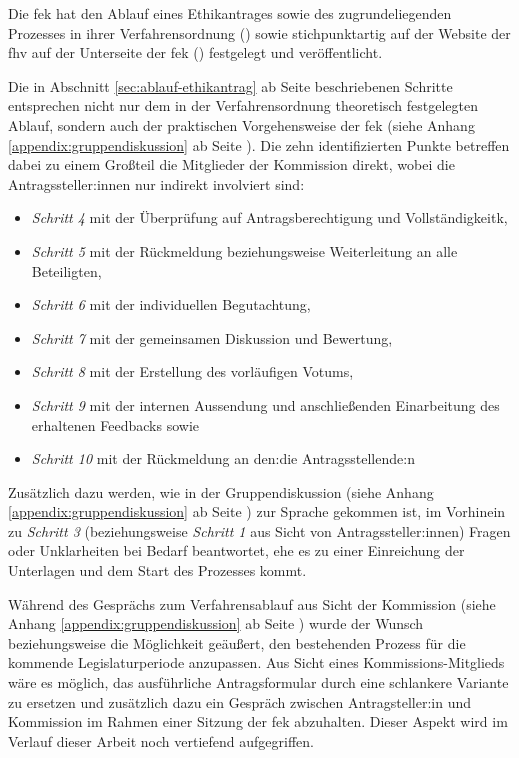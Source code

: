\documentclass[a4paper,12pt,twoside]{scrreprt}
\begin{document}
Die \acl{fek} hat den Ablauf eines Ethikantrages sowie des zugrundeliegenden Prozesses in ihrer Verfahrensordnung (\cite{forschungsethik-kommission_der_fachhochschule_vorarlberg_verfahrensordnung_2020}) sowie stichpunktartig auf der Website der \ac{fhv} auf der Unterseite der \ac{fek} (\cite{fachhochschule_vorarlberg_gmbh_forschungsethik-kommission_2021}) festgelegt und veröffentlicht.

Die in Abschnitt \ref{sec:ablauf-ethikantrag} ab Seite \pageref{sec:ablauf-ethikantrag} beschriebenen Schritte entsprechen nicht nur dem in der Verfahrensordnung theoretisch festgelegten Ablauf, sondern auch der praktischen Vorgehensweise der \ac{fek} (siehe Anhang \ref{appendix:gruppendiskussion} ab Seite \pageref{appendix:gruppendiskussion}). Die zehn identifizierten Punkte betreffen dabei zu einem Großteil die Mitglieder der Kommission direkt, wobei die Antragssteller:innen nur indirekt involviert sind:
\begin{itemize}
    \item \textit{Schritt 4} mit der Überprüfung auf Antragsberechtigung und Vollständigkeitk,
    \item \textit{Schritt 5} mit der Rückmeldung beziehungsweise Weiterleitung an alle Beteiligten,
    \item \textit{Schritt 6} mit der individuellen Begutachtung,
    \item \textit{Schritt 7} mit der gemeinsamen Diskussion und Bewertung,
    \item \textit{Schritt 8} mit der Erstellung des vorläufigen Votums,
    \item \textit{Schritt 9} mit der internen Aussendung und anschließenden Einarbeitung des erhaltenen Feedbacks sowie
    \item \textit{Schritt 10} mit der Rückmeldung an den:die Antragsstellende:n
\end{itemize}

\noindent Zusätzlich dazu werden, wie in der Gruppendiskussion (siehe Anhang \ref{appendix:gruppendiskussion} ab Seite \pageref{appendix:gruppendiskussion}) zur Sprache gekommen ist, im Vorhinein zu \textit{Schritt 3} (beziehungsweise \textit{Schritt 1} aus Sicht von Antragssteller:innen) Fragen oder Unklarheiten bei Bedarf beantwortet, ehe es zu einer Einreichung der Unterlagen und dem Start des Prozesses kommt.

\medskip

Während des Gesprächs zum Verfahrensablauf aus Sicht der Kommission (siehe Anhang \ref{appendix:gruppendiskussion} ab Seite \pageref{appendix:gruppendiskussion}) wurde der Wunsch beziehungsweise die Möglichkeit geäußert, den bestehenden Prozess für die kommende Legislaturperiode anzupassen. Aus Sicht eines Kommissions-Mitglieds wäre es möglich, das ausführliche Antragsformular durch eine schlankere Variante zu ersetzen und zusätzlich dazu ein Gespräch zwischen Antragsteller:in und Kommission im Rahmen einer Sitzung der \ac{fek} abzuhalten. Dieser Aspekt wird im Verlauf dieser Arbeit noch vertiefend aufgegriffen.
\end{document}
